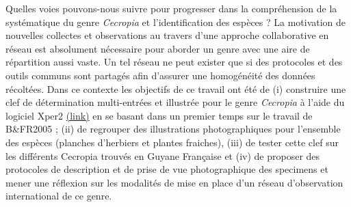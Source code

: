 \documentclass[a4paper]{article}
\theoremstyle{definition}
\theoremstyle{definition}
\theoremstyle{definition}
\theoremstyle{remark}
\begin{document}
Quelles voies pouvons-nous suivre pour progresser dans la compréhension
de la systématique du genre \emph{Cecropia} et l'identification des
espèces ? La motivation de nouvelles collectes et observations au
travers d'une approche collaborative en réseau est absolument nécessaire
pour aborder un genre avec une aire de répartition aussi vaste. Un tel
réseau ne peut exister que si des protocoles et des outils communs sont
partagés afin d'assurer une homogénéité des données récoltées. Dans ce
contexte les objectifs de ce travail ont été de (i) construire une clef
de détermination multi-entrées et illustrée pour le genre
\emph{Cecropia} à l'aide du logiciel Xper2
\href{http://lis-upmc.snv.jussieu.fr/lis/?q=ressources/logiciels/xper2}{(link)}
en se basant dans un premier temps sur le travail de B\&FR2005 ; (ii) de
regrouper des illustrations photographiques pour l'ensemble des espèces
(planches d'herbiers et plantes fraiches), (iii) de tester cette clef
sur les différents Cecropia trouvés en Guyane Française et (iv) de
proposer des protocoles de description et de prise de vue photographique
des specimens et mener une réflexion sur les modalités de mise en place
d'un réseau d'observation international de ce genre.
\end{document}
